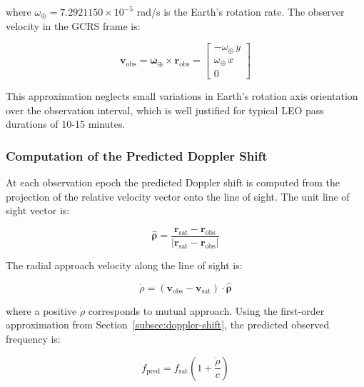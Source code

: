 \documentclass[lineno,pdflatex,sn-basic,referee,]{sn-jnl}
\begin{document}
\noindent
where $\omega_\oplus = 7.2921150 \times 10^{-5}$ rad/s is the Earth's rotation rate. The observer velocity in the GCRS frame is:

\begin{equation}
    \mathbf{v}_{\mathrm{obs}}
    = \boldsymbol{\omega}_\oplus \times \mathbf{r}_{\mathrm{obs}}
    = \begin{bmatrix} -\omega_\oplus\,y \\ \omega_\oplus\,x \\ 0 \end{bmatrix}
    \label{eq:observer-vel}
\end{equation}

This approximation neglects small variations in Earth's rotation axis orientation over the observation interval, which is well justified for typical LEO pass durations of 10-15 minutes.


\subsubsection{Computation of the Predicted Doppler Shift}
\label{subsubsec:predicted-doppler}

At each observation epoch the predicted Doppler shift is computed from the projection of the relative velocity vector onto the line of sight. The unit line of sight vector is:

\begin{equation}
    \hat{\boldsymbol{\rho}}
    = \frac{\mathbf{r}_{\mathrm{sat}} - \mathbf{r}_{\mathrm{obs}}}
           {|\mathbf{r}_{\mathrm{sat}} - \mathbf{r}_{\mathrm{obs}}|}
    \label{eq:los-unit}
\end{equation}

The radial approach velocity along the line of sight is:

\begin{equation}
    \dot{\rho}
    = (\mathbf{v}_{\mathrm{obs}} - \mathbf{v}_{\mathrm{sat}})
      \cdot \hat{\boldsymbol{\rho}}
    \label{eq:rdot}
\end{equation}

\noindent
where a positive $\dot{\rho}$ corresponds to mutual approach. Using the first-order approximation from Section~\ref{subsec:doppler-shift}, the predicted observed frequency is:

\begin{equation}
    f_{\mathrm{pred}} = f_{\mathrm{sat}}
        \left(1 + \frac{\dot{\rho}}{c}\right)
    \label{eq:fpred}
\end{equation}
\end{document}
